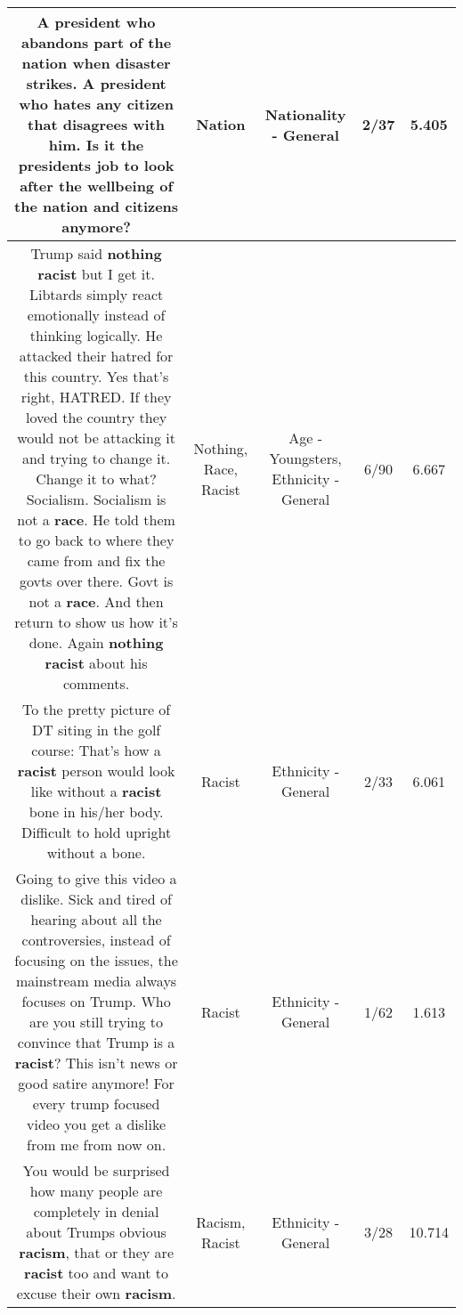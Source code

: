 \documentclass[11pt]{article}
\newlength\mylength
\begin{document}
\begin{center}
\begin{longtable}{|C{.65\mylength}|C{.30\mylength}|C{.12\mylength}|C{.12\mylength}|C{.12\mylength}|}
  \small A president who abandons part of the \textbf{nation} when disaster strikes. A president who hates any citizen that disagrees with him. Is it the presidents job to look after the wellbeing of the \textbf{nation} and citizens anymore?\normalsize   & Nation & Nationality - General & 2/37 & 5.405 \\  \hline
  \small Trump said \textbf{nothing} \textbf{racist} but I get it. Libtards simply react emotionally instead of thinking logically. He attacked their hatred for this country. Yes that's right, HATRED. If they loved the country they would not be attacking it and trying to change it. Change it to what? Socialism. Socialism is not a \textbf{race}. He told them to go back to where they came from and fix the govts over there. Govt is not a \textbf{race}. And then return to show us how it's done. Again \textbf{nothing} \textbf{racist} about his comments.\normalsize   & Nothing, Race, Racist & Age - Youngsters, Ethnicity - General & 6/90 & 6.667 \\  \hline
  \small To the pretty picture of DT siting in the golf course: That's how a \textbf{racist} person would look like without a \textbf{racist} bone in his/her body. Difficult to hold  upright  without a bone.\normalsize   & Racist & Ethnicity - General & 2/33 & 6.061 \\  \hline
  \small Going to give this video a dislike. Sick and tired of hearing about all the controversies, instead of focusing on the issues, the mainstream media always focuses on Trump. Who are you still trying to convince that Trump is a \textbf{racist}? This isn't news  or good satire anymore! For every trump focused video you get a dislike from me from now on.\normalsize   & Racist & Ethnicity - General & 1/62 & 1.613 \\  \hline
  \small You would be surprised how many people are completely in denial about Trumps obvious \textbf{racism}, that or they are \textbf{racist} too and want to excuse their own \textbf{racism}.\normalsize   & Racism, Racist & Ethnicity - General & 3/28 & 10.714 \\  \hline

\end{longtable}
\end{center}
\end{document}
